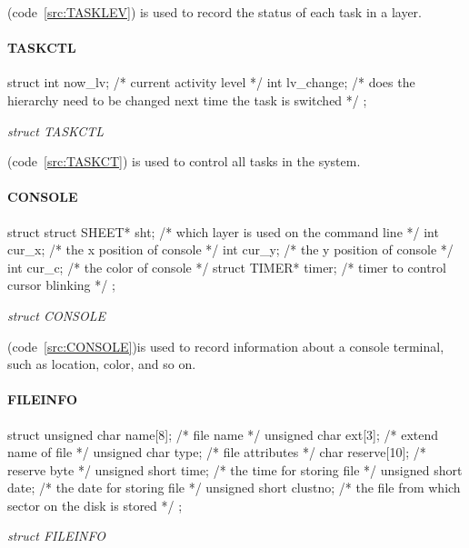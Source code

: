 \documentclass{swfcthesis}
\begin{document}
(code~\ref{src:TASKLEV}) is used to record the status of each task in a layer.


\paragraph{TASKCTL}

\begin{listing}[H]
  \begin{codeblock}
\begin{ccode}
struct 
{ 
  int now_lv;    /* current activity level */
  int lv_change; /* does the hierarchy need to be changed next time the task is switched */
};
\end{ccode}
  \end{codeblock}
  \caption{\emph{struct TASKCTL}}\label{src:TASKCT}
\end{listing}

(code~\ref{src:TASKCT}) is used to control all tasks in the system.



\paragraph{CONSOLE}

\begin{listing}[H]
  \begin{codeblock}
\begin{ccode}
struct 
{ 
  struct SHEET* sht;   /* which layer is used on the command line */
  int cur_x;           /* the x position of console */
  int cur_y;           /* the y position of console */
  int cur_c;           /* the color of console */
  struct TIMER* timer; /* timer to control cursor blinking */
};
\end{ccode}
  \end{codeblock}
  \caption{\emph{struct CONSOLE}}\label{src:CONSOLE}
\end{listing}

(code~\ref{src:CONSOLE})is used to record information about a console terminal, such as location,
color, and so on.




\paragraph{FILEINFO}

\begin{listing}[H]
  \begin{codeblock}
\begin{ccode}
struct
{ 
  unsigned char name[8];   /* file name */
  unsigned char ext[3];    /* extend name of file */
  unsigned char type;      /* file attributes */
  char reserve[10];        /* reserve byte */
  unsigned short time;     /* the time for storing file */
  unsigned short date;     /* the date for storing file */
  unsigned short  clustno; /* the file from which sector on the disk is stored */
};
\end{ccode}
  \end{codeblock}
  \caption{\emph{struct FILEINFO}}\label{src:FILEINFO}
\end{listing}
\end{document}
